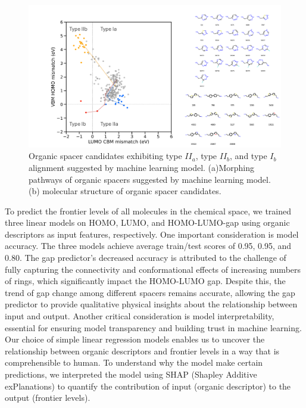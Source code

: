 \begin{figure}[!ht]
\centering
\includegraphics[width=\textwidth]{figures/machine-learning/machine-learning-3.png}
\caption[Organic spacer candidates exhibiting type $II_a$, type $II_b$, and type $I_b$ alignment suggested by machine learning model.]{Organic spacer candidates exhibiting type $II_a$, type $II_b$, and type $I_b$ alignment suggested by machine learning model. (a)Morphing pathways of organic spacers suggested by machine learning model. (b) molecular structure of organic spacer candidates. }
\label{f:machinelearning3}
\end{figure}

To predict the frontier levels of all molecules in the chemical space, we trained three linear models on HOMO, LUMO, and HOMO-LUMO-gap using organic descriptors as input features, respectively. One important consideration is model accuracy. The three models achieve average train/test scores of 0.95, 0.95, and 0.80. The gap predictor’s decreased accuracy is attributed to the challenge of fully capturing the connectivity and conformational effects of increasing numbers of rings, which significantly impact the HOMO-LUMO gap. Despite this, the trend of gap change among different spacers remains accurate, allowing the gap predictor to provide qualitative physical insights about the relationship between input and output. Another critical consideration is model interpretability, essential for ensuring model transparency and building trust in machine learning. Our choice of simple linear regression models enables us to uncover the relationship between organic descriptors and frontier levels in a way that is comprehensible to human. To understand why the model make certain predictions, we interpreted the model using SHAP (Shapley Additive exPlanations) to quantify the contribution of input (organic descriptor) to the output (frontier levels).

